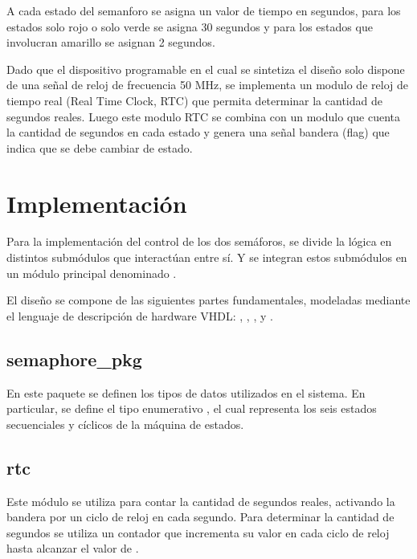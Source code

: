\documentclass[12pt]{article}
\begin{document}
A cada estado del semanforo se asigna un valor de tiempo en segundos, para los
estados solo rojo o solo verde se asigna 30 segundos y para los estados que
involucran amarillo se asignan 2 segundos.

Dado que el dispositivo programable en el cual se sintetiza el diseño solo
dispone de una señal de reloj de frecuencia 50 MHz, se implementa un modulo de
reloj de tiempo real (Real Time Clock, RTC) que permita determinar la cantidad
de segundos reales. Luego este modulo RTC se combina con un modulo que cuenta la
cantidad de segundos en cada estado y genera una señal bandera (flag) que indica
que se debe cambiar de estado.

\hypertarget{implementacion}{%
\section{Implementación}\label{implementacion}}

Para la implementación del control de los dos semáforos, se divide la lógica
en distintos submódulos que interactúan entre sí. Y se integran estos submódulos
en un módulo principal denominado .

El diseño se compone de las siguientes partes fundamentales, modeladas mediante
el lenguaje de descripción de hardware VHDL: , ,
,  y .

\hypertarget{semaphore\_pkg}{%
\subsection{semaphore\_pkg}\label{semaphore_pkg}}

En este paquete se definen los tipos de datos utilizados en el sistema. En
particular, se define el tipo enumerativo , el cual representa
los seis estados secuenciales y cíclicos de la máquina de estados.

\hypertarget{rtc}{%
\subsection{rtc}\label{rtc}}

Este módulo se utiliza para contar la cantidad de segundos reales, activando la
bandera  por un ciclo de reloj en cada segundo. Para determinar
la cantidad de segundos se utiliza un contador que incrementa su valor en cada
ciclo de reloj hasta alcanzar el valor de .
\end{document}
